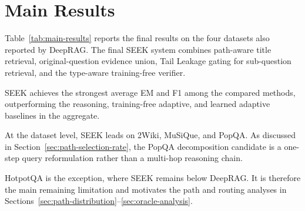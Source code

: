 \section{Main Results}
\label{sec:main-results}

Table~\ref{tab:main-results} reports the final results on the four datasets also reported by DeepRAG. The final SEEK system combines path-aware title retrieval, original-question evidence union, Tail Leakage gating for sub-question retrieval, and the type-aware training-free verifier.

\begin{table}[h]
    \centering
    \caption[Main Results]{Main results across all datasets.}
    \label{tab:main-results}
    \setlength{\tabcolsep}{4pt}
    \scriptsize
\end{table}

SEEK achieves the strongest average EM and F1 among the compared methods, outperforming the reasoning, training-free adaptive, and learned adaptive baselines in the aggregate.

At the dataset level, SEEK leads on 2Wiki, MuSiQue, and PopQA. As discussed in Section~\ref{sec:path-selection-rate}, the PopQA decomposition candidate is a one-step query reformulation rather than a multi-hop reasoning chain.

HotpotQA is the exception, where SEEK remains below DeepRAG. It is therefore the main remaining limitation and motivates the path and routing analyses in Sections~\ref{sec:path-distribution}--\ref{sec:oracle-analysis}.
